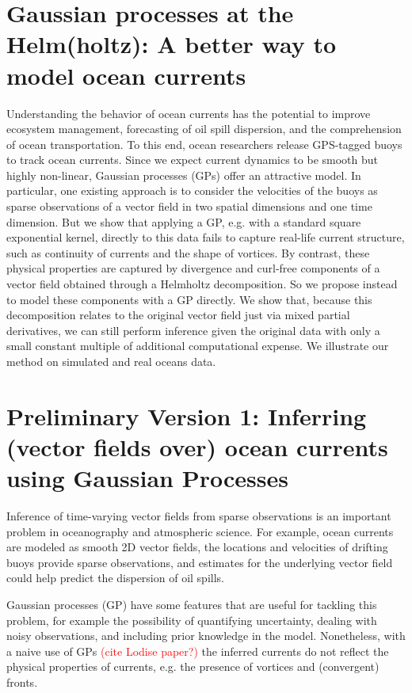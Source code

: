 \documentclass[11pt,a4paper]{article}
\begin{document}
 


\section*{Gaussian processes at the Helm(holtz): A better way to model ocean currents}

Understanding the behavior of ocean currents has the potential to improve ecosystem management, forecasting of oil spill dispersion, and the comprehension of ocean transportation. To this end, ocean researchers release GPS-tagged buoys to track ocean currents. Since we expect current dynamics to be smooth but highly non-linear, Gaussian processes (GPs) offer an attractive model. In particular, one existing approach is to consider the velocities of the buoys as sparse observations of a vector field in two spatial dimensions and one time dimension. But we show that applying a GP, e.g. with a standard square exponential kernel, directly to this data fails to capture real-life current structure, such as continuity of currents and the shape of vortices. By contrast, these physical properties are captured by divergence and curl-free components of a vector field obtained through a Helmholtz decomposition. So we propose instead to model these components with a GP directly. We show that, because this decomposition relates to the original vector field just via mixed partial derivatives, we can still perform inference given the original data with only a small constant multiple of additional computational expense. We illustrate our method on simulated and real oceans data.

\newpage


\section*{Preliminary Version 1: Inferring (vector fields over) ocean currents using Gaussian Processes}

Inference of time-varying vector fields from sparse observations is an important problem in oceanography and atmospheric science. For example, ocean currents are modeled as smooth 2D vector fields, the locations and velocities of drifting buoys provide sparse observations, and estimates for the underlying vector field could help predict the dispersion of oil spills.

Gaussian processes (GP) have some features that are useful for tackling this problem, for example the possibility of quantifying uncertainty, dealing with noisy observations, and including prior knowledge in the model. Nonetheless, with a naive use of GPs \textcolor{red}{(cite Lodise paper?)} the inferred currents do not reflect the physical properties of currents, e.g. the presence of vortices and (convergent) fronts.
\end{document}
